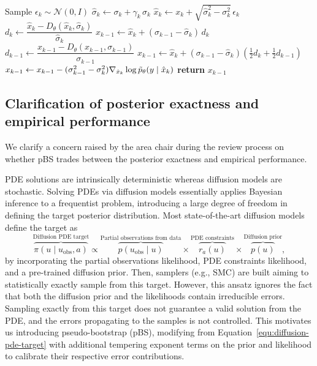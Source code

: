 \begin{algorithm}[h!]
\caption{SOSaG Proposal}
\label{alg:our_proposal}
\begin{algorithmic}[1]
    \STATE Sample $\epsilon_{k} \sim \mathcal{N}(0, I)$
    \STATE $\hat{\sigma}_{k} \leftarrow \sigma_{k} + \gamma_{k}\,\sigma_{k}$
    \STATE $\hat{x}_{k} \leftarrow x_{k} +
           \sqrt{\hat{\sigma}^{2}_{k} - \sigma^{2}_{k}}\,\epsilon_{k}$
    \STATE $d_{k} \leftarrow
           \dfrac{\hat{x}_{k} - D_{\theta}(\hat{x}_{k},\hat{\sigma}_{k})}
           {\hat{\sigma}_{k}}$
    \STATE $x_{k-1} \leftarrow \hat{x}_{k} +
           (\sigma_{k-1} - \hat{\sigma}_{k})\,d_{k}$
        \STATE $d_{k-1} \leftarrow
        \dfrac{x_{k-1} - D_{\theta}(x_{k-1},\sigma_{k-1})}{\sigma_{k-1}}$
        \STATE $x_{k-1} \leftarrow \hat{x}_{k} +
        (\sigma_{k-1} - \hat{\sigma}_{k})\left(\tfrac{1}{2}d_{k} + \tfrac{1}{2}d_{k-1}\right)$
    \ENDIF
    \STATE $x_{k-1} \leftarrow x_{k-1} - (\sigma_{k-1}^2 - \sigma_{k}^2) \nabla_{\hat{x}_{k}} \log \Tilde{p}_\theta (y \mid \hat{x}_{k})$
    \STATE \textbf{return} $x_{k-1}$
\end{algorithmic}
\end{algorithm} 

\subsection{Clarification of posterior exactness and empirical performance}
\label{app:clarification-target}
We clarify a concern raised by the area chair during the review process on whether pBS trades between the posterior exactness and empirical performance. 

PDE solutions are intrinsically deterministic whereas diffusion models are stochastic. 
Solving PDEs via diffusion models essentially applies Bayesian inference to a frequentist problem, introducing a large degree of freedom in defining the target posterior distribution. 
Most state-of-the-art diffusion models define the target as 
%
\begin{equation}
    \overbrace{\pi(u \mid u_{\mathrm{obs}}, a)}^{\text{Diffusion PDE target}} \propto \overbrace{p(u_{\mathrm{obs}} \mid u)}^{\text{Partial observations from data}} \times \overbrace{r_a(u)}^{\text{PDE constraints}} \times \overbrace{p(u)}^{\text{Diffusion prior}},
    \label{equ:diffusion-pde-target}
\end{equation}
%
by incorporating the partial observations likelihood, PDE constraints likelihood, and a pre-trained diffusion prior. 
Then, samplers (e.g., SMC) are built aiming to statistically exactly sample from this target. 
However, this ansatz ignores the fact that both the diffusion prior and the likelihoods contain irreducible errors. 
Sampling exactly from this target does not guarantee a valid solution from the PDE, and the errors propagating to the samples is not controlled. 
This motivates us introducing pseudo-bootstrap (pBS), modifying from Equation~\eqref{equ:diffusion-pde-target} with additional tempering exponent terms on the prior and likelihood to calibrate their respective error contributions. %

